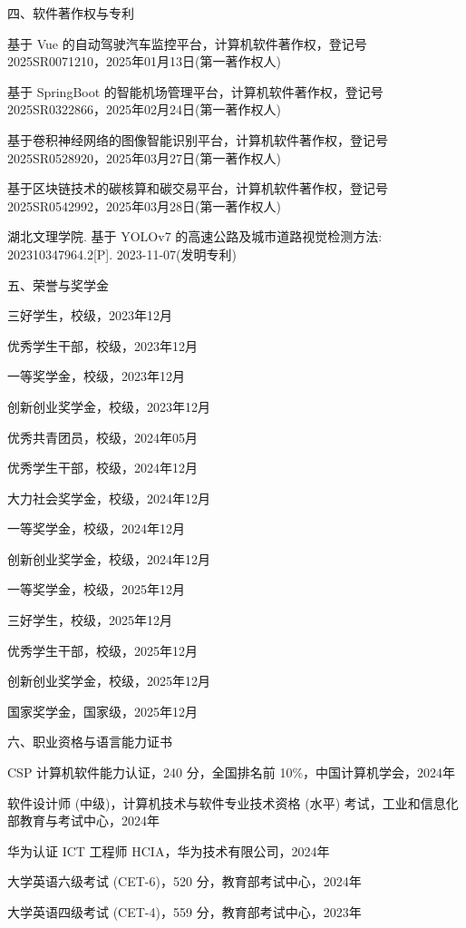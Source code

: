 {\noindent 四、软件著作权与专利

\begin{enumerate}[label={[\arabic*]},wide=2em,itemsep=2pt,topsep=2pt]
  \item 基于 Vue 的自动驾驶汽车监控平台，计算机软件著作权，登记号 2025SR0071210，2025年01月13日(第一著作权人)
  \item 基于 SpringBoot 的智能机场管理平台，计算机软件著作权，登记号 2025SR0322866，2025年02月24日(第一著作权人)
  \item 基于卷积神经网络的图像智能识别平台，计算机软件著作权，登记号 2025SR0528920，2025年03月27日(第一著作权人)
  \item 基于区块链技术的碳核算和碳交易平台，计算机软件著作权，登记号 2025SR0542992，2025年03月28日(第一著作权人)
  \item 湖北文理学院. 基于 YOLOv7 的高速公路及城市道路视觉检测方法: 202310347964.2[P]. 2023-11-07(发明专利)
\end{enumerate}

\noindent 五、荣誉与奖学金

\begin{enumerate}[label={[\arabic*]},wide=2em,itemsep=2pt,topsep=2pt]
  \item 三好学生，校级，2023年12月
  \item 优秀学生干部，校级，2023年12月
  \item 一等奖学金，校级，2023年12月
  \item 创新创业奖学金，校级，2023年12月
  \item 优秀共青团员，校级，2024年05月
  \item 优秀学生干部，校级，2024年12月
  \item 大力社会奖学金，校级，2024年12月
  \item 一等奖学金，校级，2024年12月
  \item 创新创业奖学金，校级，2024年12月
  \item 一等奖学金，校级，2025年12月
  \item 三好学生，校级，2025年12月
  \item 优秀学生干部，校级，2025年12月
  \item 创新创业奖学金，校级，2025年12月
  \item 国家奖学金，国家级，2025年12月
\end{enumerate}

\noindent 六、职业资格与语言能力证书

\begin{enumerate}[label={[\arabic*]},wide=2em,itemsep=2pt,topsep=2pt]
  \item CSP 计算机软件能力认证，240 分，全国排名前 10\%，中国计算机学会，2024年
  \item 软件设计师 (中级)，计算机技术与软件专业技术资格 (水平) 考试，工业和信息化部教育与考试中心，2024年
  \item 华为认证 ICT 工程师 HCIA，华为技术有限公司，2024年
  \item 大学英语六级考试 (CET-6)，520 分，教育部考试中心，2024年
  \item 大学英语四级考试 (CET-4)，559 分，教育部考试中心，2023年
\end{enumerate}

}
